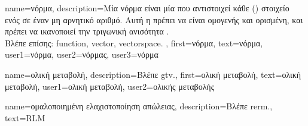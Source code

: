 {name={\foreignlanguage{greek}{νόρμα}},
	description={\foreignlanguage{greek}{Μία νόρμα είναι μία}  
		\foreignlanguage{greek}{που αντιστοιχεί κάθε} () \foreignlanguage{greek}{στοιχείο ενός} 
		 \foreignlanguage{greek}{σε έναν μη αρνητικό αριθμό. Αυτή η}  
		\foreignlanguage{greek}{πρέπει να είναι ομογενής και ορισμένη, και πρέπει να ικανοποιεί την τριγωνική 
		ανισότητα} \cite{HornMatAnalysis}.\\
		\foreignlanguage{greek}{Βλέπε επίσης:} \gls{function}, \gls{vector}, \gls{vectorspace}. },
	first={\foreignlanguage{greek}{νόρμα}},
	text={\foreignlanguage{greek}{νόρμα}},
	user1={\foreignlanguage{greek}{νόρμα}}, %
    	user2={\foreignlanguage{greek}{νόρμας}}, %
	user3={\foreignlanguage{greek}{νόρμα}} %
}

{name={\foreignlanguage{greek}{ολική μεταβολή}}, 
	description={\foreignlanguage{greek}{Βλέπε} \gls{gtv}.},
	first={\foreignlanguage{greek}{ολική μεταβολή}},
	text={\foreignlanguage{greek}{ολική μεταβολή}},
	user1={\foreignlanguage{greek}{ολική μεταβολή}}, %
	user2={\foreignlanguage{greek}{ολικής μεταβολής}} %
}

 {name={\foreignlanguage{greek}{ομαλοποιημένη ελαχιστοποίηση απώλειας}},
 	description={\foreignlanguage{greek}{Βλέπε} \gls{rerm}.},
 	text={RLM}
 }

